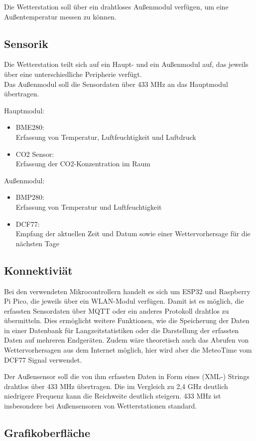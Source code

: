 \documentclass[a4paper,11pt]{article}
\begin{document}
\noindent
Die Wetterstation soll über ein drahtloses Außenmodul verfügen, um eine Außentemperatur messen zu können. 
\subsection{Sensorik}
\label{subsub:sensorik}

Die Wetterstation teilt sich auf ein Haupt- und ein Außenmodul auf, das jeweils über eine unterschiedliche Peripherie verfügt. \\
Das Außenmodul soll die Sensordaten über 433 MHz an das Hauptmodul übertragen. 

\vspace{0.2cm} \noindent
Hauptmodul:
\begin{itemize}
  \item BME280: \\
        Erfassung von Temperatur, Luftfeuchtigkeit und Luftdruck
  \item CO2 Sensor: \\
        Erfassung der CO2-Konzentration im Raum
\end{itemize}

\vspace{0.2cm} \noindent
Außenmodul:
\begin{itemize}
  \item BMP280: \\
        Erfassung von Temperatur und Luftfeuchtigkeit
  \item DCF77: \\
        Empfang der aktuellen Zeit und Datum sowie einer Wettervorhersage für die nächsten Tage
\end{itemize}

\subsection{Konnektiviät}
\label{subsub:konnektivität}

Bei den verwendeten Mikrocontrollern handelt es sich um ESP32 und Raspberry Pi Pico, die jeweils über ein WLAN-Modul verfügen.
Damit ist es möglich, die erfassten Sensordaten über MQTT oder ein anderes Protokoll drahtlos zu übermitteln. Dies ermöglicht weitere
Funktionen, wie die Speicherung der Daten in einer Datenbank für Langzeitstatistiken oder die Darstellung der erfassten Daten auf
mehreren Endgeräten. Zudem wäre theoretisch auch das Abrufen von Wettervorhersagen aus dem Internet möglich, hier wird aber die MeteoTime
vom DCF77 Signal verwendet. 

\noindent
Der Außensensor soll die von ihm erfassten Daten in Form eines (XML-) Strings drahtlos über 433 MHz übertragen. Die im Vergleich zu
2,4 GHz deutlich niedrigere Frequenz kann die Reichweite deutlich steigern. 433 MHz ist insbesondere bei Außensensoren von Wetterstationen standard. 

\subsection{Grafikoberfläche}
\label{subsub:grafikoberfläche}
\end{document}
